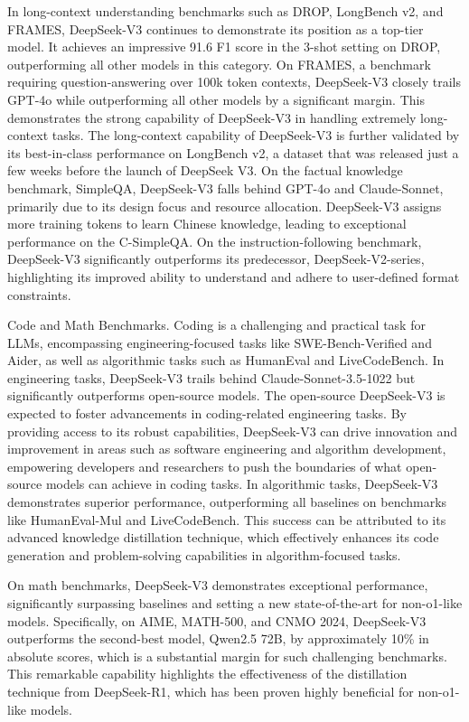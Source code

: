 \documentclass[11pt,a4paper]{article}
\begin{document}
In long-context understanding benchmarks such as DROP, LongBench v2, and FRAMES, DeepSeek-V3 continues to demonstrate its position as a top-tier model. 
It achieves an impressive 91.6 F1 score in the 3-shot setting on DROP, outperforming all other models in this category. 
On FRAMES, a benchmark requiring question-answering over 100k token contexts, DeepSeek-V3 closely trails GPT-4o while outperforming all other models by a significant margin. 
This demonstrates the strong capability of DeepSeek-V3 in handling extremely long-context tasks. 
The long-context capability of DeepSeek-V3 is further validated by its best-in-class performance on LongBench v2, a dataset that was released just a few weeks before the launch of DeepSeek V3. 
On the factual knowledge benchmark, SimpleQA, DeepSeek-V3 falls behind GPT-4o and Claude-Sonnet, primarily due to its design focus and resource allocation. 
DeepSeek-V3 assigns more training tokens to learn Chinese knowledge, leading to exceptional performance on the C-SimpleQA. 
On the instruction-following benchmark, DeepSeek-V3 significantly outperforms its predecessor, DeepSeek-V2-series, highlighting its improved ability to understand and adhere to user-defined format constraints.

Code and Math Benchmarks.
Coding is a challenging and practical task for LLMs, encompassing engineering-focused tasks like SWE-Bench-Verified and Aider, as well as algorithmic tasks such as HumanEval and LiveCodeBench. 
In engineering tasks, DeepSeek-V3 trails behind Claude-Sonnet-3.5-1022 but significantly outperforms open-source models. 
The open-source DeepSeek-V3 is expected to foster advancements in coding-related engineering tasks. 
By providing access to its robust capabilities, DeepSeek-V3 can drive innovation and improvement in areas such as software engineering and algorithm development, empowering developers and researchers to push the boundaries of what open-source models can achieve in coding tasks. 
In algorithmic tasks, DeepSeek-V3 demonstrates superior performance, outperforming all baselines on benchmarks like HumanEval-Mul and LiveCodeBench. 
This success can be attributed to its advanced knowledge distillation technique, which effectively enhances its code generation and problem-solving capabilities in algorithm-focused tasks.

On math benchmarks, DeepSeek-V3 demonstrates exceptional performance, significantly surpassing baselines and setting a new state-of-the-art for non-o1-like models. 
Specifically, on AIME, MATH-500, and CNMO 2024, DeepSeek-V3 outperforms the second-best model, Qwen2.5 72B, by approximately 10\% in absolute scores, which is a substantial margin for such challenging benchmarks.
This remarkable capability highlights the effectiveness of the distillation technique from DeepSeek-R1, which has been proven highly beneficial for non-o1-like models.
\end{document}
